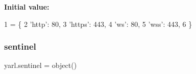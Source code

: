{\bfseries Initial value\+:}
\begin{DoxyCode}
1 =  \{
2     \textcolor{stringliteral}{'http'}: 80,
3     \textcolor{stringliteral}{'https'}: 443,
4     \textcolor{stringliteral}{'ws'}: 80,
5     \textcolor{stringliteral}{'wss'}: 443,
6 \}
\end{DoxyCode}
\mbox{\label{namespaceyarl_aa0b3b0bf74105f8136c040a3a53911f5}} 
\subsubsection{\texorpdfstring{sentinel}{sentinel}}
{\footnotesize\ttfamily yarl.\+sentinel = object()}

